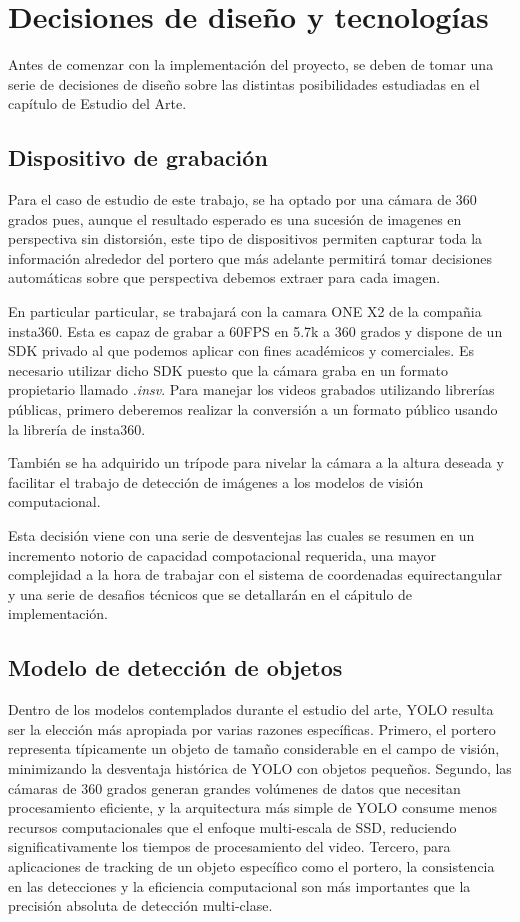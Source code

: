 \section[Decisiones de diseño]{Decisiones de diseño y tecnologías}
Antes de comenzar con la implementación del proyecto, se deben de tomar una serie de decisiones de diseño sobre las distintas posibilidades estudiadas en el capítulo de Estudio del Arte.

\subsection{Dispositivo de grabación}

Para el caso de estudio de este trabajo, se ha optado por una cámara de 360 grados pues, aunque el resultado esperado es una sucesión de imagenes en perspectiva sin distorsión, este tipo de dispositivos permiten capturar toda la información alrededor del portero que más adelante permitirá tomar decisiones automáticas sobre que perspectiva debemos extraer para cada imagen.

En particular particular, se trabajará con la camara ONE X2 de la compañia insta360. Esta es capaz de grabar a 60FPS en 5.7k a 360 grados y dispone de un SDK privado al que podemos aplicar con fines académicos y comerciales. Es necesario utilizar dicho SDK puesto que la cámara graba en un formato propietario llamado \textit{.insv}. Para manejar los videos grabados utilizando librerías públicas, primero deberemos realizar la conversión a un formato público usando la librería de insta360.

También se ha adquirido un trípode para nivelar la cámara a la altura deseada y facilitar el trabajo de detección de imágenes a los modelos de visión computacional.

Esta decisión viene con una serie de desventejas las cuales se resumen en un incremento notorio de capacidad compotacional requerida, una mayor complejidad a la hora de trabajar con el sistema de coordenadas equirectangular y una serie de desafios técnicos que se detallarán en el cápitulo de implementación.

\subsection{Modelo de detección de objetos}

Dentro de los modelos contemplados durante el estudio del arte, YOLO resulta ser la elección más apropiada por varias razones específicas. Primero, el portero representa típicamente un objeto de tamaño considerable en el campo de visión, minimizando la desventaja histórica de YOLO con objetos pequeños. Segundo, las cámaras de 360 grados generan grandes volúmenes de datos que necesitan procesamiento eficiente, y la arquitectura más simple de YOLO consume menos recursos computacionales que el enfoque multi-escala de SSD, reduciendo significativamente los tiempos de procesamiento del video. Tercero, para aplicaciones de tracking de un objeto específico como el portero, la consistencia en las detecciones y la eficiencia computacional son más importantes que la precisión absoluta de detección multi-clase.

